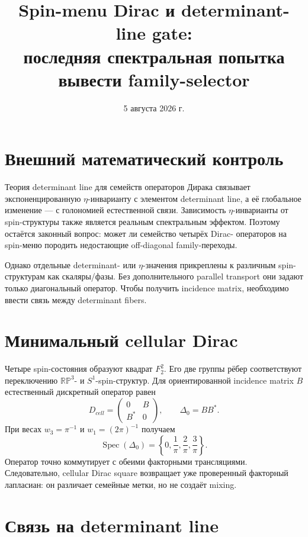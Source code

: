 \documentclass[12pt,a4paper]{article}
\title{Spin-menu Dirac и determinant-line gate:\\
последняя спектральная попытка вывести family-selector}
\author{}
\date{5 августа 2026 г.}
\DeclareMathOperator{\Spec}{Spec}
\begin{document}
\maketitle

\section{Внешний математический контроль}

Теория determinant line для семейств операторов Дирака связывает
экспоненцированную $\eta$-инварианту с элементом determinant line, а её
глобальное изменение --- с голономией естественной связи. Зависимость
$\eta$-инварианты от spin-структуры также является реальным спектральным
эффектом. Поэтому остаётся законный вопрос: может ли семейство четырёх Dirac-
операторов на spin-меню породить недостающие off-diagonal family-переходы.

Однако отдельные determinant- или $\eta$-значения прикреплены к различным
spin-структурам как скаляры/фазы. Без дополнительного parallel transport они
задают только диагональный оператор. Чтобы получить incidence matrix, необходимо
ввести связь между determinant fibers.

\section{Минимальный cellular Dirac}

Четыре spin-состояния образуют квадрат $F_2^2$. Его две группы рёбер
соответствуют переключению $\mathbb{RP}^3$- и $S^1$-spin-структур. Для
ориентированной incidence matrix $B$ естественный дискретный оператор равен
\begin{equation}
 D_{cell}=\begin{pmatrix}0&B\\ B^*&0\end{pmatrix},
 \qquad \Delta_0=BB^*.
\end{equation}
При весах $w_3=\pi^{-1}$ и $w_1=(2\pi)^{-1}$ получаем
\begin{equation}
 \Spec(\Delta_0)=
 \left\{0,\frac1\pi,\frac2\pi,\frac3\pi\right\}.
\end{equation}
Оператор точно коммутирует с обеими факторными трансляциями. Следовательно,
cellular Dirac square возвращает уже проверенный факторный лапласиан: он
различает семейные метки, но не создаёт mixing.

\section{Связь на determinant line}
\end{document}
